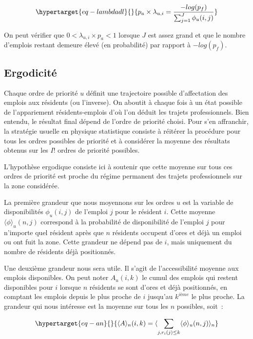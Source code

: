 \documentclass[
  10pt,
  a4paper,
  numbers=noendperiod,
  DIV=9]{scrartcl}
\begin{document}
\begin{equation}\protect\hypertarget{eq-lambdadl}{}{
p_{a} \times \lambda_{u,i} = \frac {-log(p_f)}{\sum_{j=1} ^{J} \phi_u(i,j)}
}\label{eq-lambdadl}\end{equation}

On peut vérifier que \(0<\lambda_{u,i}\times p_a<1\) lorsque \(J\) est
assez grand et que le nombre d'emplois restant demeure élevé (en
probabilité) par rapport à \(-log(p_f)\).

\hypertarget{sec-erg}{%
\subsection{Ergodicité}\label{sec-erg}}

Chaque ordre de priorité \(u\) définit une trajectoire possible
d'affectation des emplois aux résidents (ou l'inverse). On aboutit à
chaque fois à un état possible de l'appariement résidents-emplois d'où
l'on déduit les trajets professionnels. Bien entendu, le résultat final
dépend de l'ordre de priorité choisi. Pour s'en affranchir, la stratégie
usuelle en physique statistique consiste à réitérer la procédure pour
tous les ordres possibles de priorité et à considérer la moyenne des
résultats obtenus sur les \(I!\) ordres de priorité possibles.

L'hypothèse ergodique consiste ici à soutenir que cette moyenne sur tous
ces ordres de priorité est proche du régime permanent des trajets
professionnels sur la zone considérée.

La première grandeur que nous moyennons sur les ordres \(u\) est la
variable de disponibilités \(\phi_u(i,j)\) de l'emploi \(j\) pour le
résident \(i\). Cette moyenne \(\langle\phi\rangle_u(n,j)\) correspond à
la probabilité de disponibilité de l'emploi \(j\) pour n'importe quel
résident après que \(n\) résidents occupent d'ores et déjà un emploi ou
ont fuit la zone. Cette grandeur ne dépend pas de \(i\), mais uniquement
du nombre de résidents déjà positionnés.

Une deuxième grandeur nous sera utile. Il s'agit de l'accessibilité
moyenne aux emplois disponibles. On peut noter \(A_u(i,k)\) le cumul des
emplois qui restent disponibles pour \(i\) lorsque \(n\) résidents se
sont d'ores et déjà positionnés, en comptant les emplois depuis le plus
proche de \(i\) jusqu'au \(k^{ième}\) le plus proche. La grandeur qui
nous intéresse est la moyenne sur tous les \(n\) possibles, soit~:

\begin{equation}\protect\hypertarget{eq-an}{}{
\langle A \rangle_n(i,k) = \langle\sum_{j, r_i(j)\leq k} \langle \phi \rangle_u(n,j) \rangle _n
}\label{eq-an}\end{equation}
\end{document}
